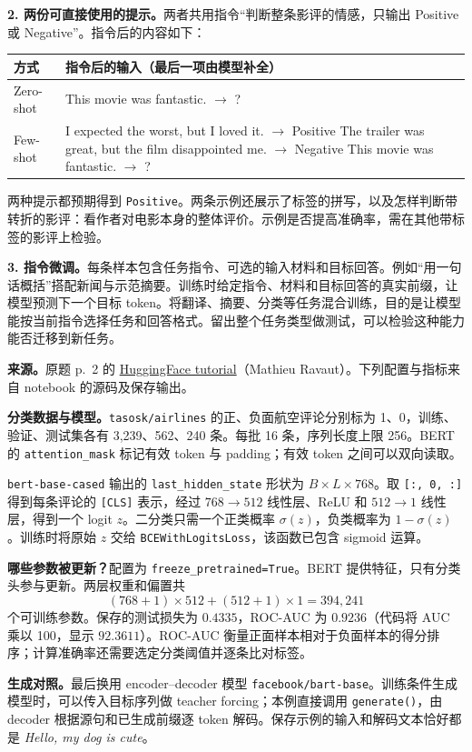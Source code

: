 \textbf{2. 两份可直接使用的提示。}两者共用指令“判断整条影评的情感，只输出 Positive 或 Negative”。指令后的内容如下：
\begin{center}
\small
\begin{tabularx}{\linewidth}{@{}lX@{}}
\toprule
方式 & 指令后的输入（最后一项由模型补全）\\
\midrule
Zero-shot & This movie was fantastic. $\to$ ? \\
Few-shot & I expected the worst, but I loved it. $\to$ Positive\newline
The trailer was great, but the film disappointed me. $\to$ Negative\newline
This movie was fantastic. $\to$ ? \\
\bottomrule
\end{tabularx}
\end{center}
两种提示都预期得到 \texttt{Positive}。两条示例还展示了标签的拼写，以及怎样判断带转折的影评：看作者对电影本身的整体评价。示例是否提高准确率，需在其他带标签的影评上检验。

\textbf{3. 指令微调。}每条样本包含任务指令、可选的输入材料和目标回答。例如“用一句话概括”搭配新闻与示范摘要。训练时给定指令、材料和目标回答的真实前缀，让模型预测下一个目标 token。将翻译、摘要、分类等任务混合训练，目的是让模型能按当前指令选择任务和回答格式。留出整个任务类型做测试，可以检验这种能力能否迁移到新任务。

\nopagebreak[4]
\textbf{来源。}原题 p.~2 的 \href{https://colab.research.google.com/drive/1k2mXI486kCSDXKrlahgxmgin8iGBWJXL?usp=sharing}{HuggingFace tutorial}（Mathieu Ravaut）。下列配置与指标来自 notebook 的源码及保存输出。

\textbf{分类数据与模型。}\texttt{tasosk/airlines} 的正、负面航空评论分别标为 1、0，训练、验证、测试集各有 3,239、562、240 条。每批 16 条，序列长度上限 256。BERT 的 \texttt{attention\_mask} 标记有效 token 与 padding；有效 token 之间可以双向读取。

\texttt{bert-base-cased} 输出的 \texttt{last\_hidden\_state} 形状为 $B\times L\times768$。取 \texttt{[:, 0, :]} 得到每条评论的 \texttt{[CLS]} 表示，经过 $768\to512$ 线性层、ReLU 和 $512\to1$ 线性层，得到一个 logit $z$。二分类只需一个正类概率 $\sigma(z)$，负类概率为 $1-\sigma(z)$。训练时将原始 $z$ 交给 \texttt{BCEWithLogitsLoss}，该函数已包含 sigmoid 运算。

\textbf{哪些参数被更新？}配置为 \texttt{freeze\_pretrained=True}。BERT 提供特征，只有分类头参与更新。两层权重和偏置共
\[
  (768+1)\times512+(512+1)\times1=394{,}241
\]
个可训练参数。保存的测试损失为 $0.4335$，ROC-AUC 为 $0.9236$（代码将 AUC 乘以 100，显示 $92.3611$）。ROC-AUC 衡量正面样本相对于负面样本的得分排序；计算准确率还需要选定分类阈值并逐条比对标签。

\textbf{生成对照。}最后换用 encoder--decoder 模型 \texttt{facebook/bart-base}。训练条件生成模型时，可以传入目标序列做 teacher forcing；本例直接调用 \texttt{generate()}，由 decoder 根据源句和已生成前缀逐 token 解码。保存示例的输入和解码文本恰好都是 \textit{Hello, my dog is cute}。
\endgroup
